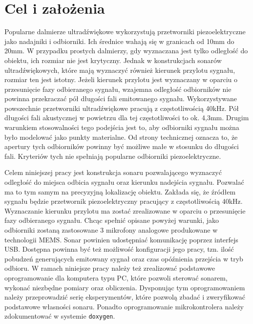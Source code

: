 \chapter{Cel i założenia}\label{ch_02}

Popularne dalmierze ultradźwiękowe wykorzystują przetworniki piezoelektryczne
jako nadajniki i odbiorniki. Ich średnice wahają się w granicach
od 10mm do 20mm.
W przypadku prostych dalmierzy, gdy wyznaczana jest tylko odległość do
obiektu, ich rozmiar nie jest krytyczny.
Jednak w konstrukcjach sonarów ultradźwiękowych, które mają wyznaczyć
również kierunek przylotu sygnału, rozmiar ten jest istotny.
Jeżeli kierunek przylotu jest wyznaczany w oparciu o przesunięcie
fazy odbieranego sygnału, wzajemna odległość odbiorników nie powinna
przekraczać pół długości fali emitowanego sygnału.
Wykorzystywane powszechnie przetworniki ultradźwiękowe pracują z częstotliwością
40kHz. Pół długości fali akustycznej w powietrzu dla tej częstotliwości
to ok. 4,3mm. Drugim warunkiem stosowalności tego podejścia
jest to, aby odbiorniki sygnału można było modelować jako punkty materialne.
Od strony technicznej oznacza to, że apertury tych odbiorników powinny być
możliwe małe w stosunku do długości fali.
Kryteriów tych nie spełniają popularne odbiorniki piezoelektryczne.

Celem niniejszej pracy jest konstrukcja sonaru pozwalającego wyznaczyć
odległość do miejsca odbicia sygnału oraz kierunku nadejścia sygnału.
Pozwalać ma to tym samym na precyzyjną lokalizację obiektu.
Zakłada się, że źródłem sygnału będzie przetwornik piezoelektryczny
pracujący z częstotliwością 40kHz.
Wyznaczanie kierunku przylotu ma zostać zrealizowane w oparciu
o przesunięcie fazy odbieranego sygnału. Chcąc spełnić opisane powyżej
warunki, jako odbiorniki zostaną zastosowane 3 mikrofony analogowe
produkowane w technologii MEMS.
Sonar powinien udostępniać komunikację poprzez interfejs USB.
Dostępna powinna być też możliwość konfiguracji jego pracy,
tzn. ilość pobudzeń generujących emitowany sygnał oraz czas opóźnienia
przejścia w tryb odbioru.
W ramach niniejsze pracy należy też zrealizować podstawowe oprogramowanie
dla komputera typu PC, które pozwoli sterować sonarem, wykonać
niezbędne pomiary oraz obliczenia. Dysponując tym oprogramowaniem
należy przeprowadzić serię eksperymentów, które pozwolą zbadać i zweryfikować
podstawowe własności sonaru. Ponadto oprogramowanie mikrokontrolera
należy zdokumentować w systemie {\tt doxygen}.

